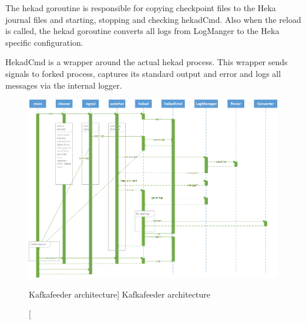 The hekad goroutine is responsible for copying checkpoint files to the Heka journal files and starting, stopping and checking hekadCmd. Also when the reload is called, the hekad goroutine converts all logs from LogManger to the Heka specific configuration.

HekadCmd is a wrapper around the actual hekad process. This wrapper sends signals to forked process, captures its standard output and error and logs all messages via the internal logger.

\begin{figure}[htb]\centering
  \includegraphics[width=1\textwidth]{images/kafkafeeder.png}
  \caption
    [Kafkafeeder architecture]
    {Kafkafeeder architecture}
  \label{fig:kafkafeeder}
\end{figure}
                            
